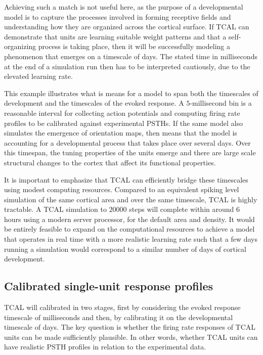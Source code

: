 \documentclass[phd,ianc,twoside]{infthesis}
\begin{document}
Achieving such a match is not useful here, as the purpose of a developmental
model is to capture the processes involved in forming receptive fields
and understanding how they are organized across the cortical surface. If
TCAL can demonstrate that units are learning suitable weight
patterns and that a self-organizing process is taking place, then it
will be successfully modeling a phenomenon that emerges on a timescale of
days. The stated time in milliseconds at the end of a simulation run
then has to be interpreted cautiously, due to the elevated learning
rate.

This example illustrates what is means for a model to span both the
timescales of development and the timescales of the evoked response. A
$5$-millisecond bin is a reasonable interval for collecting action potentials
and computing firing rate profiles to be calibrated against experimental
PSTHs. If the same model also simulates the emergence of orientation
maps, then means that the model is accounting for a developmental
process that takes place over several days. Over this timespan, the
tuning properties of the units emerge and there are large scale
structural changes to the cortex that affect its functional properties.

It is important to emphasize that TCAL can efficiently bridge these
timescales using modest computing resources. Compared to an equivalent
spiking level simulation of the same cortical area and over the same
timescale, TCAL is highly tractable. A TCAL simulation to $20000$ steps
will complete within around 6 hours using a modern server processor,
for the default area and density. It would be entirely feasible to
expand on the computational resources to achieve a model that operates
in real time with a more realistic learning rate such that a few days
running a simulation would correspond to a similar number of days of
cortical development.

\subsection{Calibrated single-unit response profiles}
\label{section:TCAL_PSTH_calibration}
TCAL will calibrated in two stages, first by considering the evoked
response timescale of milliseconds and then, by calibrating it on the
developmental timescale of days. The key question is whether the firing
rate responses of TCAL units can be made sufficiently plausible. In
other words, whether TCAL units can have realistic PSTH profiles in
relation to the experimental data.
\end{document}
